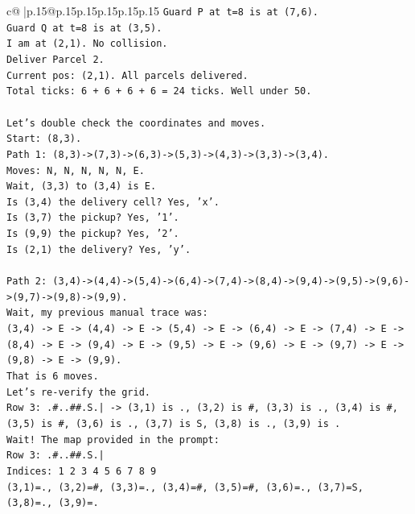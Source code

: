 \documentclass{article}
\begin{document}
{\begin{supertabular}{c@{$\;$}|p{.15\linewidth}@{}p{.15\linewidth}p{.15\linewidth}p{.15\linewidth}p{.15\linewidth}p{.15\linewidth}}
{{{\texttt{Guard P at t=8 is at (7,6).} \\
\texttt{Guard Q at t=8 is at (3,5).} \\
\texttt{I am at (2,1). No collision.} \\
\texttt{Deliver Parcel 2.} \\
\texttt{Current pos: (2,1). All parcels delivered.} \\
\texttt{Total ticks: 6 + 6 + 6 + 6 = 24 ticks. Well under 50.} \\
\\ 
\texttt{Let's double check the coordinates and moves.} \\
\texttt{Start: (8,3).} \\
\texttt{Path 1: (8,3){-}>(7,3){-}>(6,3){-}>(5,3){-}>(4,3){-}>(3,3){-}>(3,4).} \\
\texttt{Moves: N, N, N, N, N, E.} \\
\texttt{Wait, (3,3) to (3,4) is E.} \\
\texttt{Is (3,4) the delivery cell? Yes, 'x'.} \\
\texttt{Is (3,7) the pickup? Yes, '1'.} \\
\texttt{Is (9,9) the pickup? Yes, '2'.} \\
\texttt{Is (2,1) the delivery? Yes, 'y'.} \\
\\ 
\texttt{Path 2: (3,4){-}>(4,4){-}>(5,4){-}>(6,4){-}>(7,4){-}>(8,4){-}>(9,4){-}>(9,5){-}>(9,6){-}>(9,7){-}>(9,8){-}>(9,9).} \\
\texttt{Wait, my previous manual trace was:} \\
\texttt{(3,4) {-}> E {-}> (4,4) {-}> E {-}> (5,4) {-}> E {-}> (6,4) {-}> E {-}> (7,4) {-}> E {-}> (8,4) {-}> E {-}> (9,4) {-}> E {-}> (9,5) {-}> E {-}> (9,6) {-}> E {-}> (9,7) {-}> E {-}> (9,8) {-}> E {-}> (9,9).} \\
\texttt{That is 6 moves.} \\
\texttt{Let's re{-}verify the grid.} \\
\texttt{Row 3: .\#..\#\#.S.| {-}> (3,1) is ., (3,2) is \#, (3,3) is ., (3,4) is \#, (3,5) is \#, (3,6) is ., (3,7) is S, (3,8) is ., (3,9) is .} \\
\texttt{Wait! The map provided in the prompt:} \\
\texttt{Row 3: .\#..\#\#.S.|} \\
\texttt{Indices: 1 2 3 4 5 6 7 8 9} \\
\texttt{(3,1)=., (3,2)=\#, (3,3)=., (3,4)=\#, (3,5)=\#, (3,6)=., (3,7)=S, (3,8)=., (3,9)=.} \\
}}}
\end{supertabular}}
\end{document}
